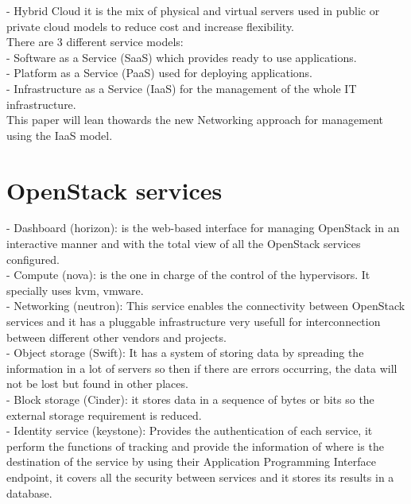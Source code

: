 - Hybrid Cloud it is the mix of physical and virtual servers used in public or private cloud models to reduce cost and increase flexibility.\\
 
There are 3 different service models:\\
 
- Software as a Service (SaaS) which provides ready to use applications.\\

- Platform as a Service (PaaS) used for deploying applications.\\

- Infrastructure as a Service (IaaS) for the management of the whole IT infrastructure.\\

This paper will lean thowards the new Networking approach for management using the IaaS model.
 
\section{OpenStack services}
 
- Dashboard (horizon): is the web-based interface for managing OpenStack in an interactive manner and with the total view of all the OpenStack services configured.\\

- Compute (nova): is the one in charge of the control of the hypervisors. It specially uses kvm, vmware.\\

- Networking (neutron): This service enables the connectivity between OpenStack services and it has a pluggable infrastructure very usefull for interconnection between different other vendors and projects.\\

- Object storage (Swift): It has a system of storing data by spreading the information in a lot of servers so then if there are errors occurring, the data will not be lost but found in other places.\\

- Block storage (Cinder): it stores data in a sequence of bytes or bits so the external storage requirement is reduced.\\

- Identity service (keystone): Provides the authentication of each service, it perform the functions of tracking and provide the information of where is the destination of the service by using their Application Programming Interface endpoint, it covers all the security between services and it stores its results in a database. \\


